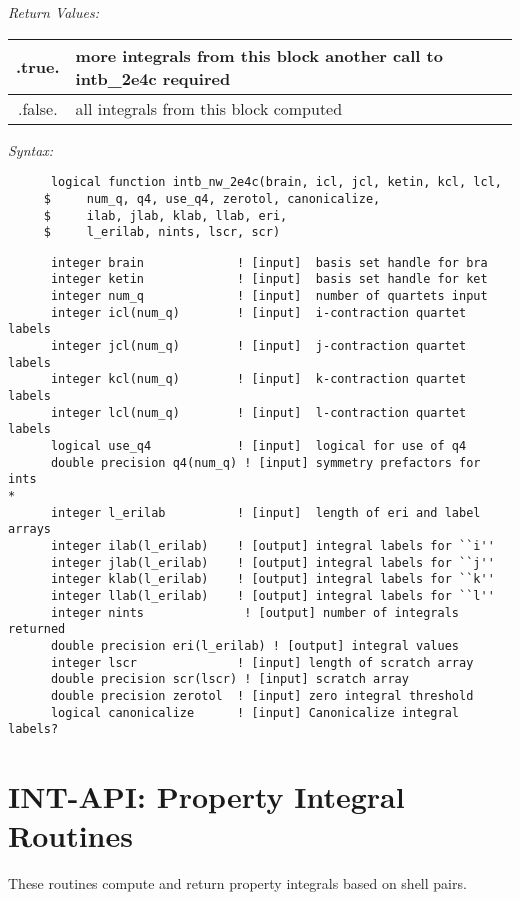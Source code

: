 {\it Return Values:} 
\begin{tabular}{|c|p{60mm}|} \hline 
 .true.  & more integrals from this block another call to intb\_2e4c required \\ \hline 
 .false. & all integrals from this block computed\\ \hline 
\end{tabular} 
 
{\it Syntax:} 
\begin{verbatim} 
      logical function intb_nw_2e4c(brain, icl, jcl, ketin, kcl, lcl, 
     $     num_q, q4, use_q4, zerotol, canonicalize, 
     $     ilab, jlab, klab, llab, eri, 
     $     l_erilab, nints, lscr, scr) 
\end{verbatim} 
\begin{verbatim} 
      integer brain             ! [input]  basis set handle for bra  
      integer ketin             ! [input]  basis set handle for ket  
      integer num_q             ! [input]  number of quartets input 
      integer icl(num_q)        ! [input]  i-contraction quartet labels 
      integer jcl(num_q)        ! [input]  j-contraction quartet labels 
      integer kcl(num_q)        ! [input]  k-contraction quartet labels 
      integer lcl(num_q)        ! [input]  l-contraction quartet labels 
      logical use_q4            ! [input]  logical for use of q4 
      double precision q4(num_q) ! [input] symmetry prefactors for ints 
*      
      integer l_erilab          ! [input]  length of eri and label arrays 
      integer ilab(l_erilab)    ! [output] integral labels for ``i''  
      integer jlab(l_erilab)    ! [output] integral labels for ``j''  
      integer klab(l_erilab)    ! [output] integral labels for ``k''  
      integer llab(l_erilab)    ! [output] integral labels for ``l''  
      integer nints              ! [output] number of integrals returned 
      double precision eri(l_erilab) ! [output] integral values 
      integer lscr              ! [input] length of scratch array 
      double precision scr(lscr) ! [input] scratch array 
      double precision zerotol  ! [input] zero integral threshold 
      logical canonicalize      ! [input] Canonicalize integral labels? 
\end{verbatim} 
\section{INT-API: Property Integral Routines} 
These routines compute and return property integrals based on shell pairs. 
% 
 
